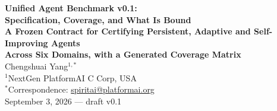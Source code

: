 
\begin{center}
{\LARGE\bfseries Unified Agent Benchmark v0.1:}\\[6pt]
{\LARGE\bfseries Specification, Coverage, and What Is Bound}\\[8pt]
{\large\bfseries A Frozen Contract for Certifying Persistent, Adaptive and Self-Improving Agents\\[2pt]
Across Six Domains, with a Generated Coverage Matrix}\\[16pt]
{\large Chengshuai Yang$^{1,*}$}\\[5pt]
{\normalsize $^{1}$NextGen PlatformAI C Corp, USA}\\[4pt]
{\normalsize $^{*}$Correspondence: \href{mailto:spiritai@platformai.org}{spiritai@platformai.org}}\\[10pt]
{\small September 3, 2026 --- draft v0.1}
\end{center}

